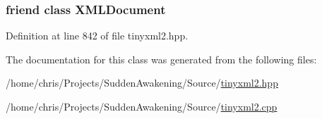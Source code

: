 \hypertarget{classtinyxml2_1_1_x_m_l_text_a4eee3bda60c60a30e4e8cd4ea91c4c6e}{
\subsubsection[{X\-M\-L\-Document}]{\setlength{\rightskip}{0pt plus 5cm}friend class {\bf X\-M\-L\-Document}\hspace{0.3cm}{\ttfamily [friend]}}}\label{classtinyxml2_1_1_x_m_l_text_a4eee3bda60c60a30e4e8cd4ea91c4c6e}


Definition at line 842 of file tinyxml2.\-hpp.



The documentation for this class was generated from the following files\-:\begin{DoxyCompactItemize}
\item 
/home/chris/\-Projects/\-Sudden\-Awakening/\-Source/\hyperlink{tinyxml2_8hpp}{tinyxml2.\-hpp}\item 
/home/chris/\-Projects/\-Sudden\-Awakening/\-Source/\hyperlink{tinyxml2_8cpp}{tinyxml2.\-cpp}\end{DoxyCompactItemize}

